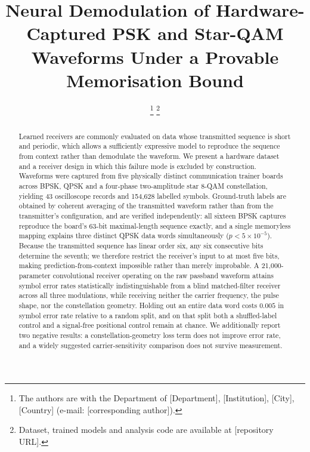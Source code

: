 \documentclass[journal]{IEEEtran}   %
\begin{document}
\title{Neural Demodulation of Hardware-Captured PSK and Star-QAM Waveforms
Under a Provable Memorisation Bound}

\author{
  \thanks{The authors are with the Department of [Department],
  [Institution], [City], [Country] (e-mail: [corresponding author]).}%
  \thanks{Dataset, trained models and analysis code are available at
  [repository URL].}%
}


\maketitle

\begin{abstract}
Learned receivers are commonly evaluated on data whose transmitted sequence is
short and periodic, which allows a sufficiently expressive model to reproduce
the sequence from context rather than demodulate the waveform. We present a
hardware dataset and a receiver design in which this failure mode is excluded by
construction. Waveforms were captured from five physically distinct
communication trainer boards across BPSK, QPSK and a four-phase two-amplitude
star 8-QAM constellation, yielding 43 oscilloscope records and 154{,}628
labelled symbols. Ground-truth labels are obtained by coherent averaging of the
transmitted waveform rather than from the transmitter's configuration, and are
verified independently: all sixteen BPSK captures reproduce the board's 63-bit
maximal-length sequence exactly, and a single memoryless mapping explains three
distinct QPSK data words simultaneously ($p < 5\times10^{-5}$). Because the
transmitted sequence has linear order six, any six consecutive bits determine
the seventh; we therefore restrict the receiver's input to at most five bits,
making prediction-from-context impossible rather than merely improbable. A
21{,}000-parameter convolutional receiver operating on the raw passband waveform
attains symbol error rates statistically indistinguishable from a blind
matched-filter receiver across all three modulations, while receiving neither
the carrier frequency, the pulse shape, nor the constellation geometry. Holding
out an entire data word costs $0.005$ in symbol error rate relative to a random
split, and on that split both a shuffled-label control and a signal-free
positional control remain at chance. We additionally report two negative
results: a constellation-geometry loss term does not improve error rate, and a
widely suggested carrier-sensitivity comparison does not survive measurement.
\end{abstract}
\end{document}
